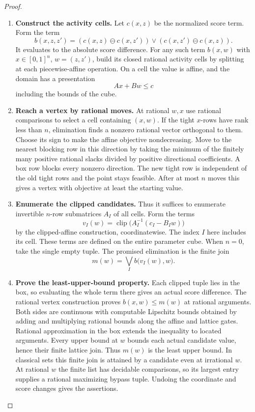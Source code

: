 \documentclass[11pt,a4paper]{article}
\theoremstyle{definition}
\theoremstyle{remark}\newaliascnt{remark}{theorem}
\numberwithin{equation}{section}
\begin{document}
\begin{proof}\leavevmode
\begin{enumerate}[titledsteps]
    \item \textbf{Construct the activity cells.} Let \(c(x,z)\) be the normalized score term. Form the term
\[
 b(x,z,z')=
 (c(x,z)\ominus c(x,z'))\vee(c(x,z')\ominus c(x,z)).
\]
It evaluates to the absolute score difference. For any such term \(b(x,w)\) with \(x\in[0,1]^n\), \(w=(z,z')\), build its closed rational activity cells by splitting at each piecewise-affine operation. On a cell the value is affine, and the domain has a presentation
\[
 A x+B w\le c
\]
including the bounds of the cube. 
    \item \textbf{Reach a vertex by rational moves.} At rational $w,x$ use rational comparisons to select a cell containing $(x,w)$. If the tight $x$-rows have rank less than $n$, elimination finds a nonzero rational vector orthogonal to them. Choose its sign to make the affine objective nondecreasing. Move to the nearest blocking row in this direction by taking the minimum of the finitely many positive rational slacks divided by positive directional coefficients. A box row blocks every nonzero direction. The new tight row is independent of the old tight rows and the point stays feasible. After at most $n$ moves this gives a vertex with objective at least the starting value. 
    \item \textbf{Enumerate the clipped candidates.} Thus it suffices to enumerate invertible $n$-row submatrices $A_I$ of all cells. Form the terms
\[
 v_I(w)=\operatorname{clip}\bigl(A_I^{-1}(c_I-B_I w)\bigr)
\]
by the clipped-affine construction, coordinatewise. The index \(I\) here includes its cell. These terms are defined on the entire parameter cube. When \(n=0\), take the single empty tuple. The promised elimination is the finite join
\[
 m(w)=\bigvee_I b\bigl(v_I(w),w\bigr).
\]

    \item \textbf{Prove the least-upper-bound property.} Each clipped tuple lies in the box, so evaluating the whole term there gives an actual score difference. The rational vertex construction proves $b(x,w)\le m(w)$ at rational arguments. Both sides are continuous with computable Lipschitz bounds obtained by adding and multiplying rational bounds along the affine and lattice gates. Rational approximation in the box extends the inequality to located arguments. Every upper bound at $w$ bounds each actual candidate value, hence their finite lattice join. Thus $m(w)$ is the least upper bound. In classical sets this finite join is attained by a candidate even at irrational $w$. At rational $w$ the finite list has decidable comparisons, so its largest entry supplies a rational maximizing bypass tuple. Undoing the coordinate and score changes gives the assertions.\qedhere
\end{enumerate}
\end{proof}
\end{document}
